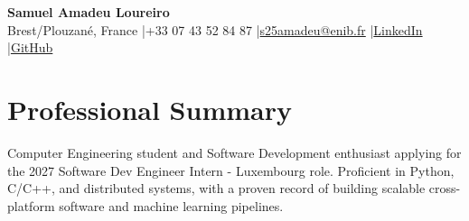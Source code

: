 \documentclass[10pt,a4paper]{article}
\begin{document}
\begin{center}
    {\Huge\bfseries\color{primary} Samuel Amadeu Loureiro}\\[2.5pt]
    \small\color{subtext}
    Brest/Plouzané, France
    \quad|\quad +33 07 43 52 84 87
    \quad|\quad \href{mailto:s25amadeu@enib.fr}{s25amadeu@enib.fr}
    \quad|\quad \href{linkedin.com/in/samuelamadeuloureiro}{LinkedIn}
    \quad|\quad \href{github.com/SamuelLoureiro}{GitHub}
\end{center}
\vspace{-6pt}

\section{Professional Summary}
\small\color{primary}
Computer Engineering student and Software Development enthusiast applying for the 2027 Software Dev Engineer Intern - Luxembourg role. Proficient in Python, C/C++, and distributed systems, with a proven record of building scalable cross-platform software and machine learning pipelines.

\end{document}
